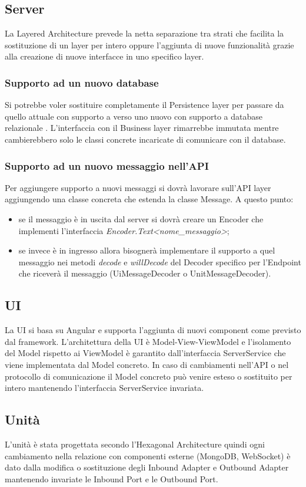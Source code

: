 \subsection{Server}
	La Layered Architecture prevede la netta separazione tra strati che facilita la sostituzione di un layer per intero oppure l'aggiunta di nuove funzionalità grazie alla creazione di nuove interfacce in uno specifico layer.
	\subsubsection{Supporto ad un nuovo database}
	Si potrebbe voler sostituire completamente il Persistence layer per passare da quello attuale con supporto a  verso uno nuovo con supporto a database relazionale . L'interfaccia con il Business layer rimarrebbe immutata mentre cambierebbero solo le classi concrete incaricate di comunicare con il database.
	\subsubsection{Supporto ad un nuovo messaggio nell'API}
	Per aggiungere supporto a nuovi messaggi si dovrà lavorare sull'API layer aggiungendo una classe concreta che estenda la classe Message. A questo punto:
	\begin{itemize}
		\item se il messaggio è in uscita dal server si dovrà creare un Encoder che implementi l'interfaccia \textit{Encoder.Text<nome\_messaggio>};
		\item se invece è in ingresso allora bisognerà implementare il supporto a quel messaggio nei metodi \textit{decode} e \textit{willDecode} del Decoder specifico per l'Endpoint che riceverà il messaggio (UiMessageDecoder o UnitMessageDecoder).
	\end{itemize}

\subsection{UI}
	La UI si basa su Angular e supporta l'aggiunta di nuovi component come previsto dal framework. L'architettura della UI è Model-View-ViewModel e l'isolamento del Model rispetto ai ViewModel è garantito dall'interfaccia ServerService che viene implementata dal Model concreto. In caso di cambiamenti nell'API o nel protocollo di comunicazione il Model concreto può venire esteso o sostituito per intero mantenendo l'interfaccia ServerService invariata.
	
\subsection{Unità}
	L'unità è stata progettata secondo l'Hexagonal Architecture quindi ogni cambiamento nella relazione con componenti esterne (MongoDB, WebSocket) è dato dalla modifica o sostituzione degli Inbound Adapter e Outbound Adapter mantenendo invariate le Inbound Port e le Outbound Port.